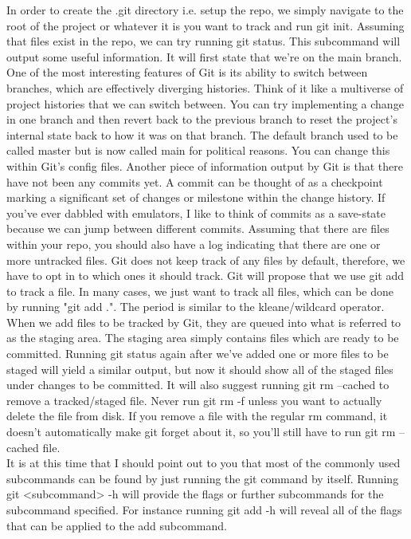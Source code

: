 \documentclass{article}
\begin{document}
In order to create the .git directory i.e. setup the repo, we simply navigate to the root of the 
project or whatever it is you want to track and run git init. Assuming that files exist in the repo, we can 
try running git status. This subcommand will output some useful information. It will first state that we're on 
the main branch. One of the most interesting features of Git is its ability to switch between branches, which 
are effectively diverging histories. Think of it like a multiverse of project histories that we can switch 
between. You can try implementing a change in one branch and then revert back to the previous branch to reset 
the project's internal state back to how it was on that branch. The default branch used to be called master but 
is now called main for political reasons. You can change this within Git's config files. Another piece of 
information output by Git is that there have not been any commits yet. A commit can be thought of as a 
checkpoint marking a significant set of changes or milestone within the change history. If you've ever dabbled 
with emulators, I like to think of commits as a save-state because we can jump between different commits. 
Assuming that there are files within your repo, you should also have a log indicating that there are one or 
more untracked files. Git does not keep track of any files by default, therefore, we have to opt in to which 
ones it should track. Git will propose that we use git add to track a file. In many cases, we just want to 
track all files, which can be done by running "git add .". The period is similar to the kleane/wildcard 
operator.\\

When we add files to be tracked by Git, they are queued into what is referred to as the staging area. The 
staging area simply contains files which are ready to be committed. Running git status again after we've 
added one or more files to be staged will yield a similar output, but now it should show all of the staged 
files under changes to be committed. It will also suggest running git rm --cached to remove a tracked/staged
file. Never run git rm -f unless you want to actually delete the file from disk. If you remove a file with 
the regular rm command, it doesn't automatically make git forget about it, so you'll still have to run 
git rm --cached file.\\

It is at this time that I should point out to you that most of the commonly used subcommands can be found by 
just running the git command by itself. Running git <subcommand> -h will provide the flags or further 
subcommands for the subcommand specified. For instance running git add -h will reveal all of the flags that 
can be applied to the add subcommand. 
\end{document}
